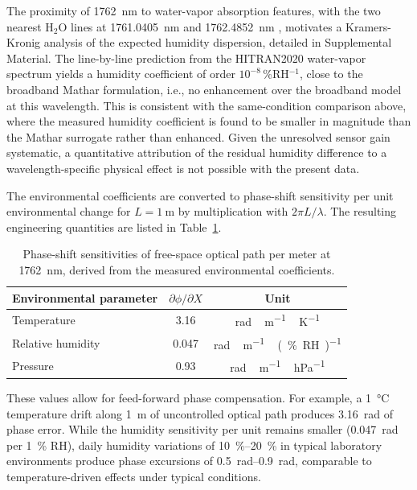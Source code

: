 \documentclass[aps,prapplied,reprint,groupedaddress,twocolumn,superscriptaddress,linenumbers]{revtex4-2}
\begin{document}
The proximity of \SI{1762}{\nano\meter} to water-vapor absorption features, with the two nearest H$_2$O lines at \SI{1761.0405}{\nano\meter} and \SI{1762.4852}{\nano\meter} \cite{gordon2022hitran2020}, motivates a Kramers-Kronig analysis of the expected humidity dispersion, detailed in Supplemental Material. The line-by-line prediction from the HITRAN2020 water-vapor spectrum yields a humidity coefficient of order $10^{-8}$\,\%RH$^{-1}$, close to the broadband Mathar formulation, i.e., no enhancement over the broadband model at this wavelength. This is consistent with the same-condition comparison above, where the measured humidity coefficient is found to be smaller in magnitude than the Mathar surrogate rather than enhanced. Given the unresolved sensor gain systematic, a quantitative attribution of the residual humidity difference to a wavelength-specific physical effect is not possible with the present data.

The environmental coefficients are converted to phase-shift sensitivity per unit environmental change for $L = \SI{1}{\meter}$ by multiplication with $2\pi L / \lambda$. The resulting engineering quantities are listed in Table~\ref{tab:phase_shift}.

\begin{table}[htbp]
\centering
\caption{Phase-shift sensitivities of free-space optical path per meter
         at \SI{1762}{\nano\meter}, derived from the measured environmental
         coefficients.}
\label{tab:phase_shift}
\begin{tabular}{lcc}
\hline
Environmental parameter & $\partial\phi/\partial X$ & Unit \\
\hline
Temperature          & 3.16  & \si{rad\,m^{-1}\,K^{-1}} \\
Relative humidity    & 0.047 & \si{rad\,m^{-1}\,(\%RH)^{-1}} \\
Pressure             & 0.93  & \si{rad\,m^{-1}\,hPa^{-1}} \\
\hline
\end{tabular}
\end{table}

These values allow for feed-forward phase compensation. For example, a \SI{1}{\degreeCelsius} temperature drift along \SI{1}{\meter} of uncontrolled optical path produces \SI{3.16}{\radian} of phase error. While the humidity sensitivity per unit remains smaller (\SI{0.047}{\radian} per \SI{1}{\percent} RH), daily humidity variations of \SIrange{10}{20}{\percent} in typical laboratory environments produce phase excursions of \SIrange{0.5}{0.9}{\radian}, comparable to temperature-driven effects under typical conditions.
\end{document}
